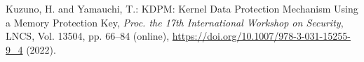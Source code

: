 \documentclass[11pt,a4paper]{article}
\begin{document}




\begin{thebibliography}{99}



  Kuzuno, H. and Yamauchi, T.: KDPM: Kernel Data Protection Mechanism Using a Memory Protection Key,
  \textit{Proc. the 17th International Workshop on Security}, LNCS, Vol. 13504, pp. 66--84 (online),
  \url{https://doi.org/10.1007/978-3-031-15255-9_4} (2022).

  
\end{thebibliography}
\end{document}
